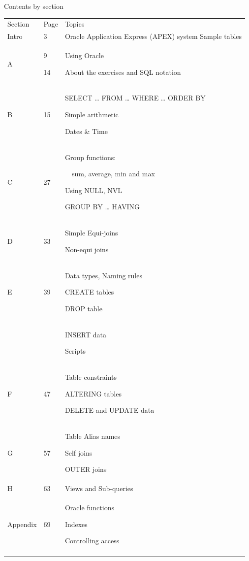 \documentclass{article}
\begin{document}
\begin{center}

\begin{minipage}{13.25cm}
Contents by section

\begin{flushleft}
\tablefirsthead{}
\tablehead{}
\tabletail{}
\tablelasttail{}

\begin{supertabular}{m{2.1069999cm}m{1.433cm}m{21.439cm}}
Section & Page & Topics\\
\centering Intro & 3 & Oracle Application Express (APEX) system Sample tables\\
\centering A &
9

14 &
Using Oracle

About the exercises and SQL notation\\
\centering B &
15 &
SELECT {\dots} FROM {\dots} WHERE {\dots} ORDER BY

Simple arithmetic

Dates \& Time\\
\centering C &
27 &
Group functions:

\ \ sum, average, min and max

Using NULL, NVL

GROUP BY {\dots} HAVING\\
\centering D &
33 &
Simple Equi-joins

Non-equi joins\\
\centering E &
39 &
Data types, Naming rules 

CREATE tables

DROP table\\
 &
 &
INSERT data

Scripts\\
\centering F &
47 &
Table constraints

ALTERING tables

DELETE and UPDATE data\\
\centering G &
57 &
Table Alias names

Self joins

OUTER joins\\
\centering H &
63 &
Views and Sub-queries \\
\centering Appendix &
69 &
Oracle functions 

Indexes

Controlling access\\
 &
 &
\\
\end{supertabular}
\end{flushleft}
\end{minipage}
\end{center}
\end{document}
